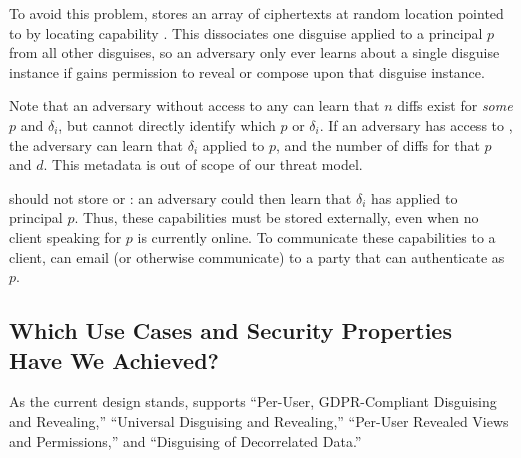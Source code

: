 To avoid this problem, \sys stores 
an array of  ciphertexts at random location pointed to by locating capability
.  This dissociates one disguise applied to a principal $p$ from all other
disguises, so an adversary only ever learns about a single disguise instance if \sys gains
permission to reveal or compose upon that disguise instance.

Note that an adversary without access to any  can learn that $n$ diffs exist for
\emph{some} $p$ and $\delta_i$, but cannot directly identify which $p$ or $\delta_i$.
If an adversary has access to , the adversary can learn that $\delta_i$
applied to $p$, and the number of  diffs for that $p$ and $d$. This metadata is out of scope of our threat model.

\sys should not store  or : an adversary could then
learn that $\delta_i$ has applied to principal $p$. Thus, these capabilities must be stored externally,
even when no client speaking for $p$ is currently online.
%
%
To communicate these capabilities to a client,
\sys can email (or otherwise communicate)  to a party that can authenticate as $p$. 

\subsection{Which Use Cases and Security Properties Have We Achieved?}
As the current design stands, \sys supports ``Per-User, GDPR-Compliant Disguising and
Revealing,'' ``Universal Disguising and Revealing,'' ``Per-User Revealed Views and
Permissions,'' and ``Disguising of Decorrelated Data.''

